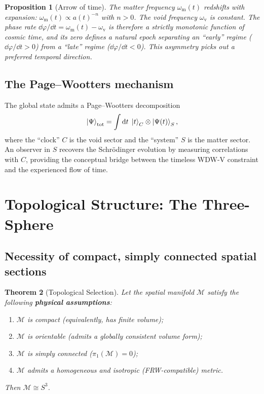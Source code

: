 \documentclass[12pt,a4paper]{article}
\theoremstyle{plain}
\newtheorem{theorem}{Theorem}[section]
\newtheorem{proposition}[theorem]{Proposition}
\theoremstyle{definition}
\newcommand{\omm}{\omega_{\mathrm{m}}}
\newcommand{\omv}{\omega_{\mathrm{v}}}
\newcommand{\Mth}{\mathcal{M}}
\begin{document}
\begin{proposition}[Arrow of time]
\label{prop:arrow}
The matter frequency $\omm(t)$ redshifts with expansion:
$\omm(t)\propto a(t)^{-n}$ with $n>0$.
The void frequency $\omv$ is constant.
The phase rate $\dd\varphi/\dd t = \omm(t) - \omv$ is therefore a
strictly monotonic function of cosmic time, and its zero defines a
natural epoch separating an ``early'' regime ($\dd\varphi/\dd t > 0$)
from a ``late'' regime ($\dd\varphi/\dd t < 0$).
This asymmetry picks out a preferred temporal direction.
\end{proposition}

\subsection{The Page--Wootters mechanism}

The global state admits a Page--Wootters decomposition
\begin{equation}
  \ket\Psi_{\mathrm{tot}}
  = \int\dd t\;\ket{t}_C\otimes\ket{\Psi(t)}_S,
  \label{eq:PW}
\end{equation}
where the ``clock'' $C$ is the void sector and the ``system'' $S$ is the
matter sector. An observer in $S$ recovers the Schr\"odinger evolution by
measuring correlations with $C$, providing the conceptual bridge between the
timeless WDW-V constraint and the experienced flow of time.

\section{Topological Structure: The Three-Sphere}
\label{sec:topology}

\subsection{Necessity of compact, simply connected spatial sections}

\begin{theorem}[Topological Selection]
\label{thm:topology}
Let the spatial manifold $\Mth$ satisfy the following
\textbf{physical assumptions}:
\begin{enumerate}[label=\textbf{(P\arabic*)}]
  \item\label{P1} $\Mth$ is compact (equivalently, has finite volume);
  \item\label{P2} $\Mth$ is orientable (admits a globally consistent
        volume form);
  \item\label{P3} $\Mth$ is simply connected ($\pi_1(\Mth)=0$);
  \item\label{P4} $\Mth$ admits a homogeneous and isotropic
        (FRW-compatible) metric.
\end{enumerate}
Then $\Mth \cong S^3$.
\end{theorem}
\end{document}

